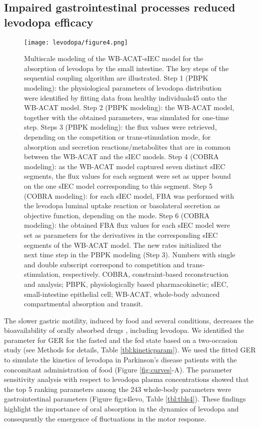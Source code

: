 \subsection{Impaired gastrointestinal processes reduced levodopa efficacy}
\begin{figure}[!htp]
\centering
	\texttt{[image: levodopa/figure4.png]}%
	\caption[Multiscale modeling of the WB-ACAT-sIEC model for the absorption of levodopa by the small intestine.]{Multiscale modeling of the WB-ACAT-sIEC model for the absorption of levodopa by the small intestine. The key steps of the sequential
coupling algorithm are illustrated. Step 1 (PBPK modeling): the physiological parameters of levodopa distribution were identified by fitting data
from healthy individuals45 onto the WB-ACAT model. Step 2 (PBPK modeling): the WB-ACAT model, together with the obtained parameters, was
simulated for one-time step. Steps 3 (PBPK modeling): the flux values were retrieved, depending on the competition or trans-stimulation mode,
for absorption and secretion reactions/metabolites that are in common between the WB-ACAT and the sIEC models. Step 4 (COBRA modeling): as
the WB-ACAT model captured seven distinct sIEC segments, the flux values for each segment were set as upper bound on the one sIEC model
corresponding to this segment. Step 5 (COBRA modeling): for each sIEC model, FBA was performed with the levodopa luminal uptake reaction or
basolateral secretion as objective function, depending on the mode. Step 6 (COBRA modeling): the obtained FBA flux values for each sIEC model
were set as parameters for the derivatives in the corresponding sIEC segments of the WB-ACAT model. The new rates initialized the next time
step in the PBPK modeling (Step 3). Numbers with single and double subscript correspond to competition and trans-stimulation, respectively.
COBRA, constraint-based reconstruction and analysis; PBPK, physiologically based pharmacokinetic; sIEC, small-intestine epithelial cell; WB-ACAT,
whole-body advanced compartmental absorption and transit.}
	\label{fig:couplemethod}
\end{figure}
The slower gastric motility, induced by food and several conditions, decreases the bioavailability of orally absorbed drugs \cite{contin2010pharmacokinetics}, including levodopa. We identified the parameter for GER for the fasted and the fed state based on a two-occasion study \cite{contin2010pharmacokinetics} (see Methods for details, Table \ref{tbl:kineticparam}). We used the fitted GER to simulate the kinetics of levodopa in Parkinson's disease patients with the concomitant administration of food (Figure \ref{fig:curves}-A). The parameter sensitivity analysis with respect to levodopa plasma concentrations showed that the top 5 ranking parameters
among the 243 whole-body parameters were gastrointestinal parameters (Figure {fig:s4levo}, Table \ref{tbl:tbls4}).
These findings highlight the importance of oral absorption in the dynamics of levodopa and consequently the emergence of fluctuations in the motor response.
